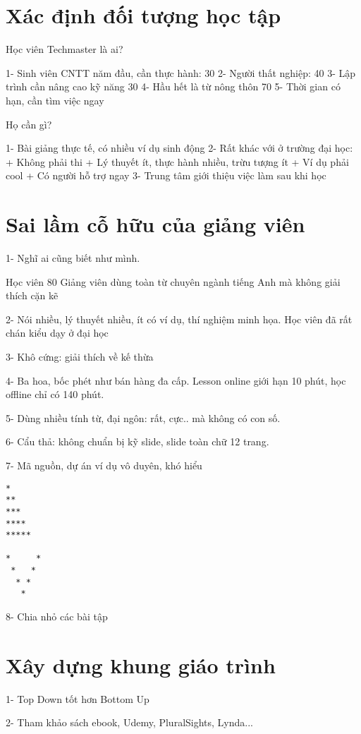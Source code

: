 \section{Xác định đối tượng học tập}

Học viên Techmaster là ai?

1- Sinh viên CNTT năm đầu, cần thực hành: 30%
2- Người thất nghiệp: 40%
3- Lập trình cần nâng cao kỹ năng 30%
4- Hầu hết là từ nông thôn 70%
5- Thời gian có hạn, cần tìm việc ngay

Họ cần gì?

1- Bài giảng thực tế, có nhiều ví dụ sinh động
2- Rất khác với ở trường đại học:
+ Không phải thi
+ Lý thuyết ít, thực hành nhiều, trừu tượng ít
+ Ví dụ phải cool
+ Có người hỗ trợ ngay
3- Trung tâm giới thiệu việc làm sau khi học

\section{Sai lầm cỗ hữu của giảng viên}

1- Nghĩ ai cũng biết như mình.

Học viên 80%
Giảng viên dùng toàn từ chuyên ngành tiếng Anh mà không giải thích cặn kẽ

2- Nói nhiều, lý thuyết nhiều, ít có ví dụ, thí nghiệm minh họa. Học viên đã rất chán kiểu dạy ở đại học

3- Khô cứng: giải thích về kế thừa

4- Ba hoa, bốc phét như bán hàng đa cấp. Lesson online giới hạn 10 phút, học offline chỉ có 140 phút.

5- Dùng nhiều tính từ, đại ngôn: rất, cực.. mà không có con số.

6- Cẩu thả: không chuẩn bị kỹ slide, slide toàn chữ
12 trang.

7- Mã nguồn, dự án ví dụ vô duyên, khó hiểu

\begin{lstlisting}
*
**
***
****
*****

*     *
 *   *
  * *
   *
\end{lstlisting}

8- Chia nhỏ các bài tập

\section{Xây dựng khung giáo trình}

1- Top Down tốt hơn Bottom Up

2- Tham khảo sách ebook, Udemy, PluralSights, Lynda...

